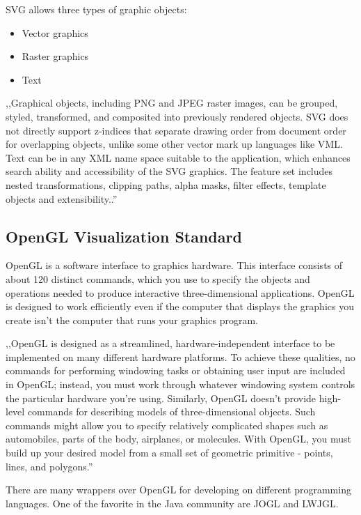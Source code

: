 SVG allows three types of graphic objects:
\begin{itemize}
\item Vector graphics
\item Raster graphics
\item Text
\end{itemize}

,,Graphical objects, including PNG and JPEG raster images, can be grouped, styled, transformed, and composited into previously rendered objects. SVG does not directly support z-indices that separate drawing order from document order for overlapping objects, unlike some other vector mark up languages like VML. Text can be in any XML name space suitable to the application, which enhances search ability and accessibility of the SVG graphics. The feature set includes nested transformations, clipping paths, alpha masks, filter effects, template objects and extensibility..''~\cite{SVG}


\subsection{OpenGL Visualization Standard}
\label{sec:opengl}
OpenGL is a software interface to graphics hardware. This interface consists of about 120 distinct commands, which you use to specify the objects and operations needed to produce interactive three-dimensional applications. OpenGL is designed to work efficiently even if the computer that displays the graphics you create isn't the computer that runs your graphics program. 


,,OpenGL is designed as a streamlined, hardware-independent interface to be implemented on many different hardware platforms. To achieve these qualities, no commands for performing windowing tasks or obtaining user input are included in OpenGL; instead, you must work through whatever windowing system controls the particular hardware you're using. Similarly, OpenGL doesn't provide high-level commands for describing models of three-dimensional objects. Such commands might allow you to specify relatively complicated shapes such as automobiles, parts of the body, airplanes, or molecules. With OpenGL, you must build up your desired model from a small set of geometric primitive - points, lines, and polygons.''~\cite{THE_RED_BOOK}


There are many wrappers over OpenGL for developing on different programming languages. One of the favorite in the Java community are JOGL and LWJGL.


